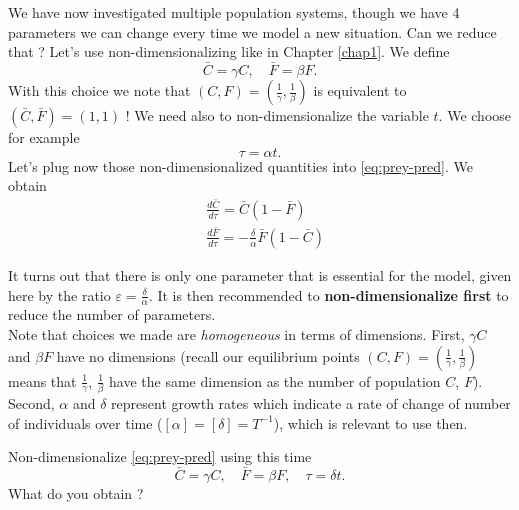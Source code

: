 We have now investigated multiple population systems, though we have 4 parameters we can change every time we model a new situation. Can we reduce that ? Let's use non-dimensionalizing like in Chapter \ref{chap1}. We define \\
\[ \bar{C} = \gamma C, \quad \bar{F} = \beta F.\]
With this choice we note that $(C,F) = (\frac{1}{\gamma},\frac{1}{\beta})$ is equivalent to $(\bar{C}, \bar{F}) = (1,1)$ !
We need also to non-dimensionalize the variable $t$. We choose for example
\[\tau = \alpha t.\] 
Let's plug now those non-dimensionalized quantities into \eqref{eq:prey-pred}. We obtain 
 \begin{equation}\label{eq:prey-pred_nd}
 \begin{aligned}
&\displaystyle \frac{d \bar{C}}{d \tau} =  \bar{C} \left( 1 - \bar{F}\right)  \\ 
&\displaystyle \frac{d \bar{F}}{d \tau } = -  \frac{\delta}{\alpha}  \bar{F} \left( 1 - \bar{C} \right)  
\end{aligned}
\end{equation}

It turns out that there is only one parameter that is essential for the model, given here by the ratio $\varepsilon = \displaystyle  \frac{\delta}{\alpha} $. It is then recommended to \textbf{non-dimensionalize first} to reduce the number of parameters.\\

Note that choices we made are \textit{homogeneous} in terms of dimensions. First, $ \gamma C$ and $\beta F$ have no dimensions (recall our equilibrium points $(C,F) = (\frac{1}{\gamma},\frac{1}{\beta})$ means that $\frac{1}{\gamma}$,  $\frac{1}{\beta}$ have the same dimension as the number of population $C$, $F$). Second, $\alpha$ and $\delta$ represent growth rates which indicate a rate of change of number of individuals over time ($[\alpha] = [\delta] =  T^{-1}$), which is relevant to use then.

 \begin{Exercise}
Non-dimensionalize \eqref{eq:prey-pred} using this time
\[ \bar{C} = \gamma C, \quad \bar{F} = \beta F, \quad  \tau = \delta t.\]
What do you obtain ?\\
  \dotfill

\dotfill

\dotfill

\dotfill

\dotfill

\dotfill

\dotfill

\dotfill

\dotfill

\dotfill
 \end{Exercise}

